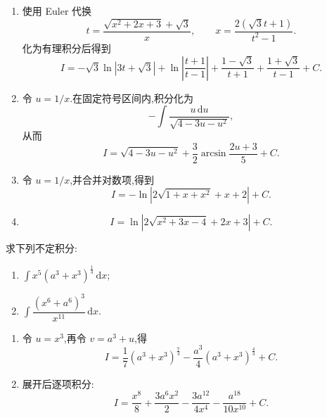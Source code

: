 \begin{solution}
    \leavevmode
    \begin{enumerate}
        \item 使用 Euler 代换
              \[
                  t=\dfrac{\sqrt{x^2+2x+3}+\sqrt3}{x},
                  \qquad
                  x=\dfrac{2(\sqrt3t+1)}{t^2-1}.
              \]
              化为有理积分后得到
              \[
                  I=-\sqrt3\ln|3t+\sqrt3|+\ln\left|\dfrac{t+1}{t-1}\right|
                  +\dfrac{1-\sqrt3}{t+1}+\dfrac{1+\sqrt3}{t-1}+C.
              \]
        \item 令 $u=1/x$.在固定符号区间内,积分化为
              \[
                  -\int\dfrac{u\,\mathrm{d}u}{\sqrt{4-3u-u^2}},
              \]
              从而
              \[
                  I=\sqrt{4-3u-u^2}+\dfrac{3}{2}\arcsin\dfrac{2u+3}{5}+C.
              \]
        \item 令 $u=1/x$,并合并对数项,得到
              \[
                  I=-\ln\left|2\sqrt{1+x+x^2}+x+2\right|+C.
              \]
        \item
              \[
                  I=\ln\left|2\sqrt{x^2+3x-4}+2x+3\right|+C.
              \]
    \end{enumerate}
\end{solution}

\begin{example}
    求下列不定积分:
    \begin{enumerate}
        \item $\displaystyle\int x^5(a^3+x^3)^{\frac{1}{3}}\,\mathrm{d}x$;
        \item $\displaystyle\int\dfrac{(x^6+a^6)^3}{x^{11}}\,\mathrm{d}x$.
    \end{enumerate}
\end{example}
\exampleblank

\begin{solution}
    \leavevmode
    \begin{enumerate}
        \item 令 $u=x^3$,再令 $v=a^3+u$,得
              \[
                  I=\dfrac{1}{7}(a^3+x^3)^{\frac{7}{3}}
                  -\dfrac{a^3}{4}(a^3+x^3)^{\frac{4}{3}}+C.
              \]
        \item 展开后逐项积分:
              \[
                  I=\dfrac{x^8}{8}+\dfrac{3a^6x^2}{2}
                  -\dfrac{3a^{12}}{4x^4}-\dfrac{a^{18}}{10x^{10}}+C.
              \]
    \end{enumerate}
\end{solution}




